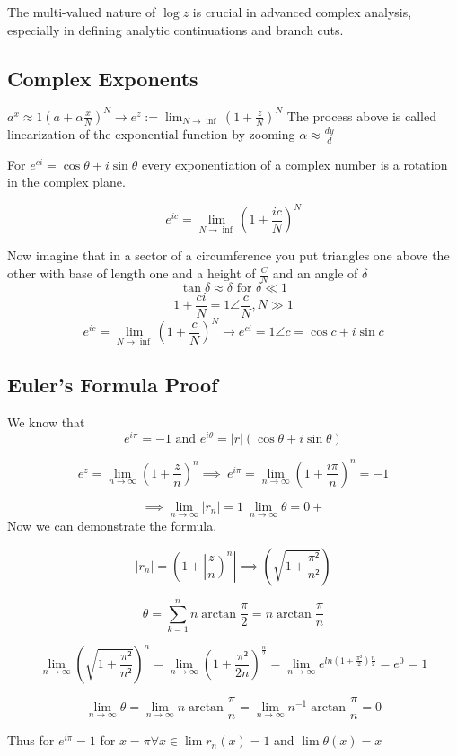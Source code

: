 The multi-valued nature of \( \log z \) is crucial in advanced complex analysis, especially in defining analytic continuations and branch cuts.

\subsection{Complex Exponents}
\(a^x \approx 1 \left(a + \alpha \frac{x}{N} \right)^N \to e^z := \lim_{N \rightarrow \inf} \left( 1 + \frac{z}{N}\right)^N \)
The process above is called linearization of the exponential function by zooming  \(\alpha \approx \frac{dy}{d}\)

 For  \(e^{ci} = \cos{\theta} + i\sin{\theta}\) every exponentiation of a complex number is a rotation 
in the complex plane.

\[
	e^{ic} = \lim_{N \to \inf} \left( 1 + \frac{ic}{N}\right)^N
\]

 Now imagine that in a sector of a circumference you put triangles one above the other with base of length one and a height of \(\frac{C}{N}\) and 
 an angle of \(\delta\)
\[
	\tan{\delta} \approx \delta \text{ for } \delta \ll 1
\]
\[
	1 + \frac{ci}{N} = 1 \angle \frac{c}{N}, N \gg 1
\]
\[
	e^{ic} = \lim_{N \to \inf} \left( 1 + \frac{c}{N}\right)^N \to e^{ci} = 1 \angle c = \cos{c} + i\sin{c}
\]

\subsection{Euler's Formula Proof}
We know that
\[
	e^{i\pi} = -1 \text{ and } e^{i\theta} = |r|(\cos{\theta} + i\sin{\theta})
\]

\[
	e^{z} = \lim_{n \to \infty} \left( 1 + \frac{z}{n}\right)^n \implies\ e^{i\pi} = \lim_{n \to \infty} \left( 1 + \frac{i\pi}{n}\right)^n = -1
\]

\[
	\implies \lim_{n \to \infty} |r_n| = 1\ \lim_{n \to \infty} \theta = 0+
\]
 Now we can demonstrate the formula.

\[
	|r_n| = \left( 1 + \left|\frac{z}{n}\right)^n\right| \implies \left( \sqrt{1 + \frac{\pi²}{n²}}\right)
\]

\[
	\theta = \sum_{k = 1}^{n} n \arctan \frac{\pi}{2} = n \arctan \frac{\pi}{n}
\]

\[
	\lim_{n \to \infty} \left( \sqrt{1 + \frac{\pi²}{n²}}\right)^n = \lim_{n \to \infty} \left( 1 + \frac{\pi²}{2n}\right)^\frac{n}{2}
	= \lim_{n \to \infty} e^{ln\left(1 +\frac{\pi²}{2}\right) \frac{n}{2}} = e^0 = 1
\]

\[
	\lim_{n \to \infty} \theta = \lim_{n \to \infty} n \arctan \frac{\pi}{n} = \lim_{n \to \infty} n^{-1} \arctan\frac{\pi}{n} = 0
\]

Thus for \(e^{i\pi} = 1\) for \(x = \pi \forall x \in \lim r_n (x) = 1\) and \( \lim \theta (x) = x\)

\QED

\newpage